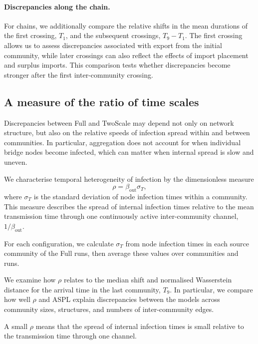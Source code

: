\documentclass{ieeeaccess}
\newcommand{\Full}{\textup{Full}}
\newcommand{\TS}{\textup{TwoScale}}
\begin{document}
\paragraph{Discrepancies along the chain.}
For chains, we additionally compare the relative shifts in the mean durations of the first crossing, $T_1$, and the subsequent crossings, $T_9-T_1$. The first crossing allows us to assess discrepancies associated with export from the initial community, while later crossings can also reflect the effects of import placement and surplus imports. This comparison tests whether discrepancies become stronger after the first inter-community crossing.

\subsection{A measure of the ratio of time scales}
\label{sec:descriptor}

Discrepancies between \Full{} and \TS{} may depend not only on network structure, but also on the relative speeds of infection spread within and between communities. In particular, aggregation does not account for when individual bridge nodes become infected, which can matter when internal spread is slow and uneven.

We characterise temporal heterogeneity of infection by the dimensionless measure
\begin{equation}
\label{eq:rho}
\rho=\beta_{\mathrm{out}}\sigma_T,
\end{equation}
where $\sigma_T$ is the standard deviation of node infection times within a community. This measure describes the spread of internal infection times relative to the mean transmission time through one continuously active inter-community channel, $1/\beta_{\mathrm{out}}$.

For each configuration, we calculate $\sigma_T$ from node infection times in each source community of the \Full{} runs, then average these values over communities and runs.

We examine how $\rho$ relates to the median shift and normalised Wasserstein distance for the arrival time in the last community, $T_9$. In particular, we compare how well $\rho$ and ASPL explain discrepancies between the models across community sizes, structures, and numbers of inter-community edges.

A small $\rho$ means that the spread of internal infection times is small relative to the transmission time through one channel.
\end{document}
